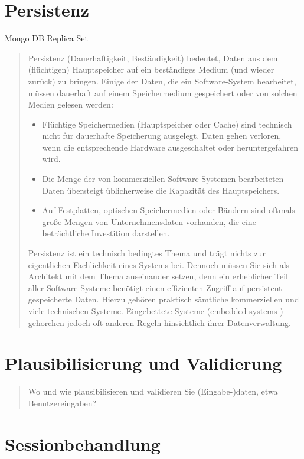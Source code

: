 \section{Persistenz}

Mongo DB
Replica Set

\begin{quote}
	Persistenz (Dauerhaftigkeit, Beständigkeit) bedeutet, Daten aus dem (flüchtigen) Hauptspeicher auf ein beständiges Medium (und wieder zurück) zu bringen.
	Einige der Daten, die ein Software-System bearbeitet, müssen dauerhaft auf einem Speichermedium gespeichert oder von solchen Medien gelesen werden:
	\begin{itemize}
		\item Flüchtige Speichermedien (Hauptspeicher oder Cache) sind technisch nicht für dauerhafte Speicherung ausgelegt. Daten gehen verloren, wenn die entsprechende Hardware ausgeschaltet oder heruntergefahren wird.
		\item Die Menge der von kommerziellen Software-Systemen bearbeiteten Daten übersteigt üblicherweise die Kapazität des Hauptspeichers.
		\item Auf Festplatten, optischen Speichermedien oder Bändern sind oftmals große Mengen von Unternehmensdaten vorhanden, die eine beträchtliche Investition darstellen.
	\end{itemize}
	Persistenz ist ein technisch bedingtes Thema und trägt nichts zur eigentlichen Fachlichkeit eines Systems bei. Dennoch müssen Sie sich als Architekt mit dem Thema auseinander setzen, denn ein erheblicher Teil aller Software-Systeme benötigt einen effizienten Zugriff auf persistent gespeicherte Daten. Hierzu gehören praktisch sämtliche kommerziellen und viele technischen Systeme. Eingebettete Systeme (embedded systems ) gehorchen jedoch oft anderen Regeln hinsichtlich ihrer Datenverwaltung.
\end{quote}

\section{Plausibilisierung und Validierung}

\begin{quote}
	Wo und wie plausibilisieren und validieren Sie (Eingabe-)daten, etwa Benutzereingaben?
\end{quote}

\section{Sessionbehandlung}

